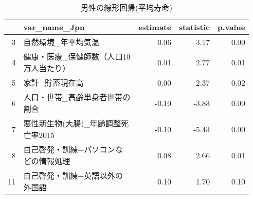 \begin{table}[H]
\centering
\caption{男性の線形回帰(平均寿命)} 
\label{UsualLMLEm}
\begingroup\tiny
\begin{adjustbox}{width=1\textwidth}
\begin{tabular}{rlrrr}
  \hline
 & var\_name\_Jpn & estimate & statistic & p.value \\ 
  \hline
  3 & 自然環境\_年平均気温 & 0.06 & 3.17 & 0.00 \\ 
  4 & 健康・医療\_保健師数（人口10万人当たり） & 0.01 & 2.77 & 0.01 \\ 
  5 & 家計\_貯蓄現在高 & 0.00 & 2.37 & 0.02 \\ 
  6 & 人口・世帯\_高齢単身者世帯の割合 & -0.10 & -3.83 & 0.00 \\ 
  7 & 悪性新生物(大腸)\_年齢調整死亡率2015 & -0.10 & -5.43 & 0.00 \\ 
  8 & 自己啓発・訓練−パソコンなどの情報処理 & 0.08 & 2.66 & 0.01 \\ 
  11 & 自己啓発・訓練−英語以外の外国語 & 0.10 & 1.70 & 0.10 \\ 
   \hline
\end{tabular}
\end{adjustbox}
\endgroup
\end{table}
